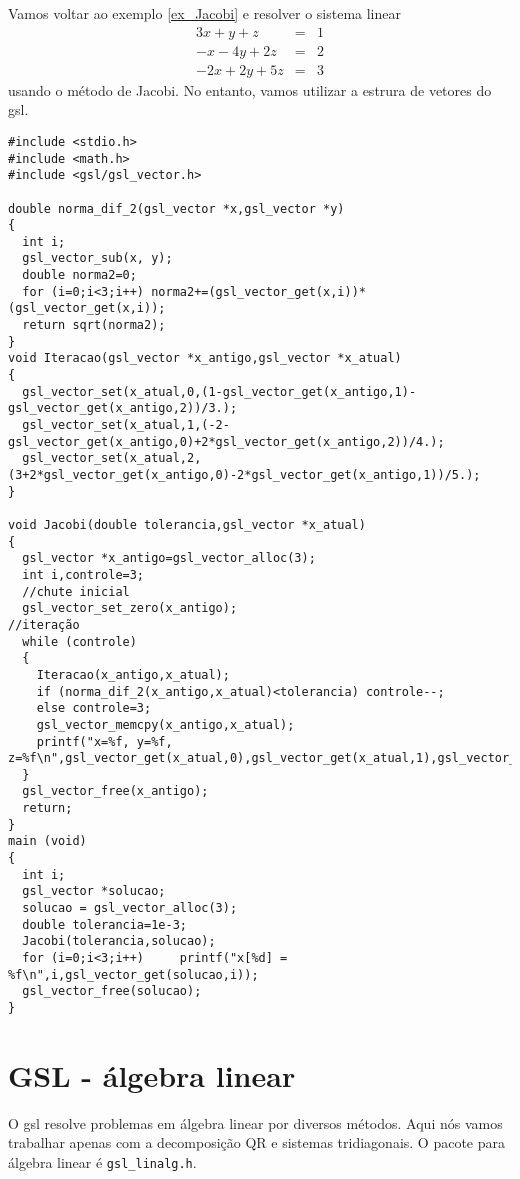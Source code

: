 \begin{ex}Vamos voltar ao exemplo \ref{ex_Jacobi} e resolver o sistema linear
 \begin{eqnarray*}
3x+y+z&=&1\\
-x-4y+2z&=&2\\
-2x+2y+5z&=&3
\end{eqnarray*}
usando o método de Jacobi. No entanto, vamos utilizar a estrura de vetores do gsl.
\end{ex}
\begin{verbatim}
#include <stdio.h>
#include <math.h>
#include <gsl/gsl_vector.h>

double norma_dif_2(gsl_vector *x,gsl_vector *y)
{
  int i;
  gsl_vector_sub(x, y);
  double norma2=0;
  for (i=0;i<3;i++) norma2+=(gsl_vector_get(x,i))*(gsl_vector_get(x,i)); 
  return sqrt(norma2);	
}
void Iteracao(gsl_vector *x_antigo,gsl_vector *x_atual)
{
  gsl_vector_set(x_atual,0,(1-gsl_vector_get(x_antigo,1)-gsl_vector_get(x_antigo,2))/3.);
  gsl_vector_set(x_atual,1,(-2-gsl_vector_get(x_antigo,0)+2*gsl_vector_get(x_antigo,2))/4.);
  gsl_vector_set(x_atual,2,(3+2*gsl_vector_get(x_antigo,0)-2*gsl_vector_get(x_antigo,1))/5.);
}

void Jacobi(double tolerancia,gsl_vector *x_atual)
{
  gsl_vector *x_antigo=gsl_vector_alloc(3);
  int i,controle=3;
  //chute inicial
  gsl_vector_set_zero(x_antigo);
//iteração
  while (controle)
  {
    Iteracao(x_antigo,x_atual);
    if (norma_dif_2(x_antigo,x_atual)<tolerancia) controle--;
    else controle=3;
    gsl_vector_memcpy(x_antigo,x_atual);
    printf("x=%f, y=%f, z=%f\n",gsl_vector_get(x_atual,0),gsl_vector_get(x_atual,1),gsl_vector_get(x_atual,2));	
  }
  gsl_vector_free(x_antigo);
  return;
}
main (void)
{
  int i;
  gsl_vector *solucao;
  solucao = gsl_vector_alloc(3);
  double tolerancia=1e-3;
  Jacobi(tolerancia,solucao);
  for (i=0;i<3;i++)     printf("x[%d] = %f\n",i,gsl_vector_get(solucao,i));
  gsl_vector_free(solucao);
}
\end{verbatim}





\section{GSL - álgebra linear}
O gsl resolve problemas em álgebra linear por diversos métodos. Aqui nós vamos trabalhar apenas com a decomposição QR e sistemas tridiagonais. O pacote para álgebra linear é \verb|gsl_linalg.h|.


